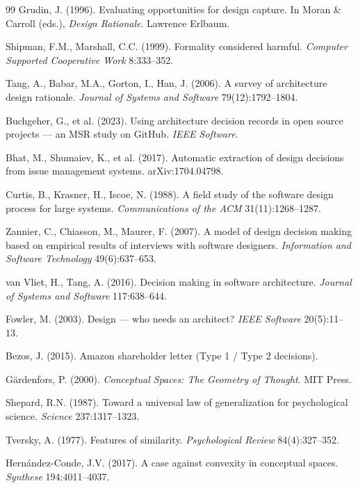 \documentclass[11pt,oneside]{article}
\theoremstyle{definition}
\begin{document}
\begin{thebibliography}{99}
 Grudin, J. (1996). Evaluating opportunities for design capture. In Moran \&
Carroll (eds.), \emph{Design Rationale}. Lawrence Erlbaum.

 Shipman, F.M., Marshall, C.C. (1999). Formality considered harmful.
\emph{Computer Supported Cooperative Work} 8:333--352.

 Tang, A., Babar, M.A., Gorton, I., Han, J. (2006). A survey of architecture
design rationale. \emph{Journal of Systems and Software} 79(12):1792--1804.

 Buchgeher, G., et al. (2023). Using architecture decision records in
open source projects --- an MSR study on GitHub. \emph{IEEE Software}.

 Bhat, M., Shumaiev, K., et al. (2017). Automatic extraction of design
decisions from issue management systems. arXiv:1704.04798.

 Curtis, B., Krasner, H., Iscoe, N. (1988). A field study of the software
design process for large systems. \emph{Communications of the ACM} 31(11):1268--1287.

 Zannier, C., Chiasson, M., Maurer, F. (2007). A model of design decision
making based on empirical results of interviews with software designers. \emph{Information and
Software Technology} 49(6):637--653.

 van Vliet, H., Tang, A. (2016). Decision making in software
architecture. \emph{Journal of Systems and Software} 117:638--644.

 Fowler, M. (2003). Design --- who needs an architect? \emph{IEEE Software}
20(5):11--13.

 Bezos, J. (2015). Amazon shareholder letter (Type 1 / Type 2 decisions).

 Gärdenfors, P. (2000). \emph{Conceptual Spaces: The Geometry of
Thought}. MIT Press.

 Shepard, R.N. (1987). Toward a universal law of generalization for
psychological science. \emph{Science} 237:1317--1323.

 Tversky, A. (1977). Features of similarity. \emph{Psychological Review}
84(4):327--352.

 Hernández-Conde, J.V. (2017). A case against convexity in conceptual
spaces. \emph{Synthese} 194:4011--4037.


\end{thebibliography}
\end{document}
